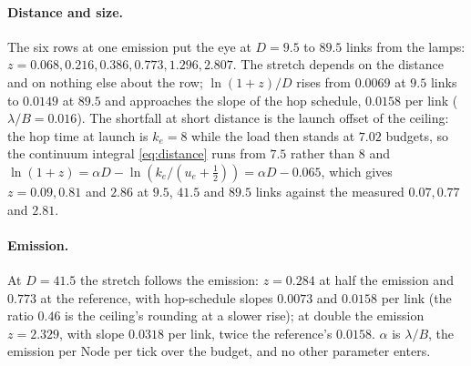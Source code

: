 \documentclass[11pt]{article}
\begin{document}
\paragraph{Distance and size.} The six rows at one emission put the eye at $D = 9.5$ to $89.5$ links from the
lamps: $z = 0.068, 0.216, 0.386, 0.773, 1.296, 2.807$. The stretch depends on
the distance and on nothing else about the row; $\ln(1+z)/D$ rises from
$0.0069$ at $9.5$ links to $0.0149$ at $89.5$ and approaches the slope of the
hop schedule, $0.0158$ per link ($\lambda/B = 0.016$). The shortfall at short
distance is the launch offset of the ceiling: the hop time at launch is
$k_e = 8$ while the load then stands at $7.02$ budgets, so the continuum
integral \eqref{eq:distance} runs from $7.5$ rather than $8$ and
$\ln(1+z) = \alpha D - \ln(k_e/(u_e + \tfrac12)) = \alpha D - 0.065$, which
gives $z = 0.09, 0.81$ and $2.86$ at $9.5$, $41.5$ and $89.5$ links against
the measured $0.07, 0.77$ and $2.81$.

\paragraph{Emission.} At $D = 41.5$ the stretch follows the emission: $z = 0.284$ at half the
emission and $0.773$ at the reference, with hop-schedule slopes $0.0073$ and
$0.0158$ per link (the ratio $0.46$ is the ceiling's rounding at a slower
rise); at double the emission $z = 2.329$, with slope $0.0318$ per link, twice the reference's $0.0158$. $\alpha$ is $\lambda/B$, the
emission per Node per tick over the budget, and no other parameter enters.
\end{document}
